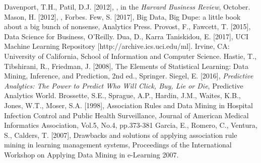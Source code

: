 



\begin{thebibliography}{99}
 Davenport, T.H., Patil, D.J. [2012], , in the \textit{Harvard Business Review}, October. 
 Mason, H. [2012], , Forbes. 
 Few, S. [2017], Big Data, Big Dupe: a little book about a big bunch of nonsense, Analytics Press. 
 Provost, F., Fawcett, T. [2015], Data Science for Business, O'Reilly. 
 Dua, D., Karra Taniskidou, E. [2017], UCI Machine Learning Repository [http://archive.ics.uci.edu/ml]. Irvine, CA: University of California, School of Information and Computer Science.
 Hastie, T., Tibshirani, R., Friedman, J. [2008], The Elements of Statistical Learning: Data Mining, Inference, and Prediction, 2nd ed., Springer.
 Siegel, E. [2016], \textit{Predictive Analytics: The Power to Predict Who Will Click, Buy, Lie or Die}, Predictive Analytics World. 
 Brossette, S.E., Sprague, A.P., Hardin, J.M., Waites, K.B., Jones, W.T., Moser, S.A. [1998], Association Rules and Data Mining in Hospital Infection Control and Public Health Surveillance, Journal of American Medical Informatics Association, Vol.5, No.4, pp.373-381
 Garcia, E., Romero, C., Ventura, S., Calders, T. [2007], Drawbacks and solutions of applying association rule mining in learning management systems, Proceedings of the International Workshop on Applying Data Mining in e-Learning 2007. 
 
 
  

\end{thebibliography}

